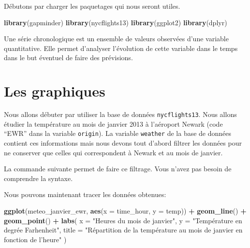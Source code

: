 \documentclass[]{book}
\newenvironment{Shaded}{\begin{snugshade}}{\end{snugshade}}
\newcommand{\KeywordTok}[1]{\textcolor[rgb]{0.13,0.29,0.53}{\textbf{#1}}}
\newcommand{\DataTypeTok}[1]{\textcolor[rgb]{0.13,0.29,0.53}{#1}}
\newcommand{\DecValTok}[1]{\textcolor[rgb]{0.00,0.00,0.81}{#1}}
\newcommand{\StringTok}[1]{\textcolor[rgb]{0.31,0.60,0.02}{#1}}
\newcommand{\OperatorTok}[1]{\textcolor[rgb]{0.81,0.36,0.00}{\textbf{#1}}}
\newcommand{\NormalTok}[1]{#1}
\begin{document}
Débutons par charger les paquetages qui nous seront utiles.

\begin{Shaded}
\begin{Highlighting}[]
\KeywordTok{library}\NormalTok{(gapminder)}
\KeywordTok{library}\NormalTok{(nycflights13)}
\KeywordTok{library}\NormalTok{(ggplot2)}
\KeywordTok{library}\NormalTok{(dplyr)}
\end{Highlighting}
\end{Shaded}

Une série chronologique est un ensemble de valeurs observées d'une
variable quantitative. Elle permet d'analyser l'évolution de cette
variable dans le temps dans le but éventuel de faire des prévisions.

\section{Les graphiques}\label{les-graphiques}

Nous allons débuter par utiliser la base de données
\texttt{nycflights13}. Nous allons étudier la température au mois de
janvier 2013 à l'aéroport Newark (code ``EWR'' dans la variable
\texttt{origin}). La variable \texttt{weather} de la base de données
contient ces informations mais nous devons tout d'abord filtrer les
données pour ne conserver que celles qui correspondent à Newark et au
mois de janvier.

La commande suivante permet de faire ce filtrage. Vous n'avez pas besoin
de comprendre la syntaxe.

\begin{Shaded}
\end{Shaded}

Nous pouvons maintenant tracer les données obtenues:

\begin{Shaded}
\begin{Highlighting}[]
\KeywordTok{ggplot}\NormalTok{(meteo_janvier_ewr, }\KeywordTok{aes}\NormalTok{(}\DataTypeTok{x =}\NormalTok{ time_hour, }\DataTypeTok{y =}\NormalTok{ temp)) }\OperatorTok{+}
\StringTok{  }\KeywordTok{geom_line}\NormalTok{() }\OperatorTok{+}
\StringTok{  }\KeywordTok{geom_point}\NormalTok{() }\OperatorTok{+}
\StringTok{  }\KeywordTok{labs}\NormalTok{(}
    \DataTypeTok{x =} \StringTok{"Heures du mois de janvier"}\NormalTok{,}
    \DataTypeTok{y =} \StringTok{"Température en degrée Farhenheit"}\NormalTok{,}
    \DataTypeTok{title =} \StringTok{"Répartition de la température au mois de janvier en fonction de l'heure"}
\NormalTok{  )}
\end{Highlighting}
\end{Shaded}
\end{document}
